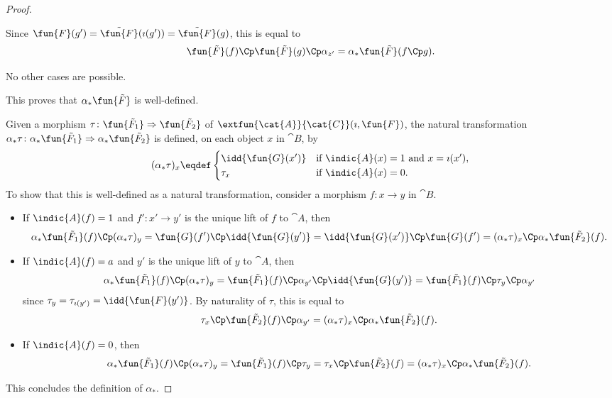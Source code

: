 \begin{proof}
\begin{enumerate}
\begin{itemize}
        Since $\fun{F}(g') = \tilde{\fun{F}}(\imath(g')) = \tilde{\fun{F}}(g)$, this is equal to 
        \[ \fun{\tilde{F}}(f)\Cp \fun{\tilde{F}}(g)\Cp \alpha_{z'} = \alpha_*\fun{\tilde{F}}(f\Cp g). \]
    \end{itemize}
    No other cases are possible.
\end{enumerate}
This proves that $\alpha_*\fun{\tilde{F}}$ is well-defined.

Given a morphism $\tau\colon \fun{\tilde{F}_1} \Rightarrow \fun{\tilde{F}_2}$ of $\extfun{\cat{A}}{\cat{C}}(\imath, \fun{F})$, the natural transformation $\alpha_*\tau\colon \alpha_*\fun{\tilde{F}_1} \Rightarrow \alpha_*\fun{\tilde{F}_2}$ is defined, on each object $x$ in $\cat{B}$, by
\begin{equation*}
    (\alpha_*\tau)_x \eqdef
    \begin{cases}
        \idd{\fun{G}(x')} & \text{if $\indic{A}(x) = 1$ and $x = \imath(x')$}, \\
        \tau_x & \text{if $\indic{A}(x) = 0$}.
    \end{cases}
\end{equation*}
To show that this is well-defined as a natural transformation, consider a morphism $f\colon x \to y$ in $\cat{B}$.
\begin{itemize}
    \item If $\indic{A}(f) = 1$ and $f'\colon x' \to y'$ is the unique lift of $f$ to $\cat{A}$, then
    \[
        \alpha_*\fun{\tilde{F}_1}(f)\Cp  (\alpha_*\tau)_y =
        \fun{G}(f')\Cp  \idd{\fun{G}(y')} = \idd{\fun{G}(x')}\Cp  \fun{G}(f') = (\alpha_*\tau)_x\Cp  \alpha_*\fun{\tilde{F}_2}(f).
    \]
    \item If $\indic{A}(f) = a$ and $y'$ is the unique lift of $y$ to $\cat{A}$, then
    \[
        \alpha_*\fun{\tilde{F}_1}(f)\Cp  (\alpha_*\tau)_y =
        \fun{\tilde{F}_1}(f)\Cp  \alpha_{y'}\Cp  \idd{\fun{G}(y')} = 
        \fun{\tilde{F}_1}(f)\Cp  \tau_{y}\Cp  \alpha_{y'}
    \]
    since $\tau_y = \tau_{\imath(y')} = \idd{\fun{F}(y')}$.
    By naturality of $\tau$, this is equal to
    \[
        \tau_x\Cp  \fun{\tilde{F}_2}(f)\Cp  \alpha_{y'} =
        (\alpha_*\tau)_x\Cp  \alpha_*\fun{\tilde{F}_2}(f).
    \]
    \item If $\indic{A}(f) = 0$, then
    \[
        \alpha_*\fun{\tilde{F}_1}(f)\Cp  (\alpha_*\tau)_y =
        \fun{\tilde{F}_1}(f)\Cp  \tau_{y} = \tau_x\Cp  \fun{\tilde{F}_2}(f) = (\alpha_*\tau)_x\Cp  \alpha_*\fun{\tilde{F}_2}(f).
    \]
\end{itemize}
This concludes the definition of $\alpha_*$.

\end{proof}
